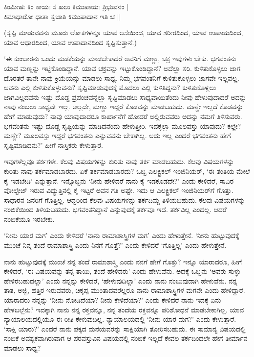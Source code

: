 \begin{shloka}
ಕಿಂಮೀಹಃ ಕಿಂ ಕಾಯಃ ಸ ಖಲು ಕಿಮುಪಾಯಃ ತ್ರಿಭುವನಂ |\\
ಕಿಮಾಧಾರೋ ಧಾತಾ ಸ್ವಜಾತಿ ಕಿಮುಪಾದಾನ ಇತಿ ಚ ||
\end{shloka}

(ಸೃಷ್ಟಿ ಮಾಡುವವನು ಮೂರು ಲೋಕಗಳನ್ನೂ ಯಾವ ಆಸೆಯಿಂದ, ಯಾವ ಶರೀರದಿಂದ, ಯಾವ ಉಪಾಯದಿಂದ, ಯಾವ ಆಧಾರದಿಂದ, ಯಾವ ಉಪಾದಾನದಿಂದ ಸೃಷ್ಟಿಸುತ್ತಾನೆ.)

`ಈ ಕುಂಬಾರನು ಒಂದು ಮಡಕೆಯನ್ನು ಮಾಡಬೇಕಾದರೆ ಅವನಿಗೆ ಮಣ್ಣು, ಚಕ್ರ ಇವುಗಳು ಬೇಕು. ಭಗವಂತನು ಯಾವ ಮಣ್ನನ್ನು ಇಟ್ಟಿಕೊಂಡಿದ್ದಾನೆ. ಯಾವ ಚಕ್ರವನ್ನು ಇಟ್ಟುಕೊಂಡಿದ್ದಾನೆ? ಅದೆಲ್ಲಾ ಸರಿ. ಕುಳಿತುಕೊಳ್ಳಲು ಜಾಗ ದೊರತರೆ ತಾನೇ ನಾವು ಕ್ರಿಯೆಯನ್ನು ಮಾಡಲು ಸಾಧ್ಯ. ನಿಮ್ಮ ಭಗವಂತನಿಗೆ ಕುಳಿತುಕೊಳ್ಳಲು ಜಾಗವೇ ಇಲ್ಲವಲ್ಲ. ಅವನು ಎಲ್ಲಿ ಕುಳಿತುಕೊಳ್ಳುವನು? ಸೃಷ್ಟಿಮಾಡುವುದಕ್ಕೆ ಮೊದಲು ಎಲ್ಲಿ ಕುಳಿತಿದ್ದನು? ಕುಳಿತುಕೊಳ್ಲಲು ಜಾಗವಿಲ್ಲದವನು ಇಷ್ಟು ದೊಡ್ಡ ಪ್ರಪಂಚವನ್ನೆಲ್ಲಾ ಸೃಷ್ಟಿಮಾಡಲು ಸಾಧ್ಯವಾಯಿತೆಂದು ನೀವು ಹೇಳುವುದಾದರೆ ಅದನ್ನು ನಾವು ನಂಬಲು ಸಾಧ್ಯವೇ ಇಲ್ಲ. ಅಲ್ಲದೇ, ಮಣ್ಣು ಇದ್ದರೆ ಕೊಡವನ್ನು ಮಾಡಬಹುದು. ಮಣ್ಣೇ ಇಲ್ಲದೆ ಕೊಡವನ್ನು ಹೇಗೆ ಮಾಡುವುದು? ನಾವು ಯಾವುದಾದರೂ ಕಾರ್ಖಾನೆಗೆ ಹೋದರೆ ಅಲ್ಲಿರುವವರು ಅದನ್ನು ನಮಗೆ ತಿಳಿಸುವರು. ಭಗವಂತನು ಇಷ್ಟು ದೊಡ್ಡ ಸೃಷ್ಟಿಯನ್ನು ಮಾಡಿದನೆಂದು ಹೇಳುತ್ತೀರಿ. ಇದಕ್ಕೆಲ್ಲಾ ಮೂಲವಸ್ತು ಯಾವುದು? ಕಲ್ಲೇ? ಮಣ್ಣೇ? ಮೂಲವಸ್ತು ಇದ್ದರೆ ಭಗವಂತನು ಎನ್ನುವವನು ಬೇಕಾಗಿಲ್ಲ. ಅದು ಇಲ್ಲ ಎಂದರೆ ಭಗವಂತನು ಹೇಗೆ ಸೃಷ್ಟಿಮಾಡಿದನು?' ಹೀಗೆ ನಾಸ್ತಿಕರು ಕೇಳುತ್ತಾರೆ.

ಇವುಗಳೆಲ್ಲವೂ ತರ್ಕಗಳೇ. ಕೆಲವು ವಿಷಯಗಳನ್ನು ಕುರಿತು ನಾವು ತರ್ಕ ಮಾಡಬಹುದು. ಕೆಲವು ವಿಷಯಗಳನ್ನು ಕುರಿತು ನಾವು ತರ್ಕಮಾಡಬಾರದು. ಏಕೆ ತರ್ಕಮಾಡಬಾರದು? ಒಬ್ಬ ಎಲಕ್ಟ್ರಿಕಲ್ ಇಂಜಿನಿಯರ್, `ಈ ತಂತಿಯ ಮೇಲೆ ಕೈ ಇಡಬೇಡಿ' ಎನ್ನುತ್ತಾನೆ. ಇನ್ನೊಬ್ಬನು `ನೀನು ಹೇಳಿದರೆ ನಾನು ಕೈ ಇಡಕೂಡದೇ?' ಎಂದು ಕೇಳಿದರೆ, ಸಾವಿರ ವೋಲ್ಟೇಜ್ ಇರುವ ವಿದ್ಯುತ್ತಿನಲ್ಲಿ ಕೈ ಇಟ್ಟರೆ ಅವನ ಗತಿ ಅಷ್ಟೇ. ಇದು ಆ ಎಲಕ್ಟ್ರಿಕಲ್ ಇಂಜಿನಿಯರ್‌ಗೆ ಗೊತ್ತು. ಸಾಧಾರನ ಜನರಿಗೆ ಗೊತ್ತಿಲ್ಲ. ಆದ್ದರಿಂದ ಕೆಲವು ವಿಷಯಗಳನ್ನು ತರ್ಕದಿಮ್ದ ತಿಳಿಯಬಹುದು. ಕೆಲವು ವಿಷಯಗಳನ್ನು ನಂಬಿಕೆಯಿಂದ ತಿಳಿಯಬಹುದು. ಭಗವಂತನಿದ್ದಾನೆ ಎನ್ನುವುದಕ್ಕೆ ತರ್ಕವೂ ಇದೆ. ತರ್ಕವಿಲ್ಲ ಎಂದಲ್ಲ. ಆದರೆ ನಂಬಿಕೆಯೂ ಇರಬೇಕು.

`ನೀನು ಯಾರ ಮಗ' ಎಂದು ಕೇಳಿದರೆ `ನಾನು ರಾಮಾಶಾಸ್ತ್ರಿಗಳ ಮಗ' ಎಂದು ಹೇಳುತ್ತೇನೆ. `ನೀನು ಹುಟ್ಟುವುದಕ್ಕೆ ಮುಂಚೆ ನಿನ್ನ ತಂದೆ ರಾಮಾಶಾಸ್ತ್ರಿ ಎಂದು ನಿನಗೆ ಗೊತ್ತೆ?' ಎಂದು ಕೇಳಿದರೆ `ಗೊತ್ತಿಲ್ಲ' ಎಂದು ಹೇಳುತ್ತೇನೆ.

ನಾನು ಹುಟ್ಟುವುದಕ್ಕೆ ಮುಂಚೆ ನನ್ನ ತಂದೆ ರಾಮಾಶಾಸ್ತ್ರಿ ಎಂದು ನನಗೆ ಹೇಗೆ ಗೊತ್ತು? ಇನ್ನೂ ಯಾರಾದರೂ, ಹೀಗೆ ಕೇಳಿದರೆ, `ಈ ವಿಷಯವನ್ನು ತನ್ನ ತಾಯಿ, ತಂದೆ ಹೇಳಿದರು' ಎಂದು ಹೇಳುವೆನು. ಅದಕ್ಕೆ ಒಬ್ಬನು `ಅವರು ಸುಳ್ಳು ಹೇಳಿರಬಹುದಲ್ಲಾ' ಎಂದು ನನ್ನನ್ನು ಕೇಳಿದರೆ, `ಹೇಳುವುದಿಲ್ಲಾ' ಎಂದು ನಾನು ನಂಬುವುದಾಗಿ ಹೇಳುವೆನು. ನನ್ನ ತಾತ, ಅಜ್ಜಿ, ಹತ್ತಿರ ಇರುವವರು, ಚಿಕ್ಕಪ್ಪ ಮುಂತಾದವರೆಲ್ಲರೂ ನಾನು ರಾಮಾಶಾಸ್ತ್ರಿಗಳ ಮಗನೇ ಎಂದು ಹೇಳಿದ್ದಾರೆ. ಯಾರಾದರು ನನ್ನನ್ನು `ನೀನು ನೋಡಿದೆಯಾ? ನೀನು ಕೇಳಿದೆಯಾ?' ಎಂದು ಕೇಳಿದರೆ ನಾನು ಇದಕ್ಕೆ ಏನು ಹೇಳಬಲ್ಲೆನು? ಇದಕ್ಕಾಗಿ ನಾನು ನನ್ನ ರಕ್ತವನ್ನೂ, ನನ್ನ ತಂದೆಯ ರಕ್ತವನ್ನೂ ಪರಿಶೋಧನೆ ಮಾಡಬೇಕಾಗಿಲ್ಲ. ಯಾವ ನ್ಯಾಯಾಲಯದಲ್ಲಿಯೂ ಈ ರೀತಿ ಕೇಳುವುದಿಲ್ಲ. ನ್ಯಾಯಾಲಯದಲ್ಲಿ `ನೀನು ಯಾರ ಮಗ?' ಎಂದು ಕೇಳುತ್ತಾರೆ. `ಸಾಕ್ಷಿ ಯಾರು?' ಎಂದರೆ ನಾನು ಪಕ್ಕದ ಮನೆಯವರನ್ನು ಸಾಕ್ಷಿಯಾಗಿ ತೋರಿಸಬಹುದು. ಈ ಸಾಮಾನ್ಯ ವಿಷಯದಲ್ಲಿ ನಂಬಿಕೆ ಅವಶ್ಯಕವಾಗಿರುವಾಗ ಆ ಪರವಸ್ತುವಿನ ವಿಷಯದಲ್ಲಿ ನಂಬಿಕೆ ಇಲ್ಲದೆ ಕೇವಲ ತರ್ಕದಿಂದಲೇ ಹೇಗೆ ತೀರ್ಮಾನ ಮಾಡಲು ಸಾಧ್ಯ?

